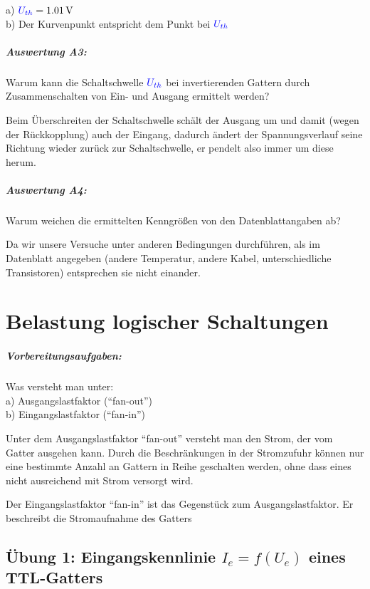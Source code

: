 \documentclass[11pt,a4paper,titlepage]{scrreprt}
\begin{document}
        a) $\textcolor{blue}{U_{th}} = \SI{1,01}{\volt}$\\
        b) Der Kurvenpunkt entspricht dem Punkt bei $\textcolor{blue}{U_{th}}$
    
        \paragraph{Auswertung A3:}\label{sec:auswertung-a3} Warum kann die Schaltschwelle $\textcolor{blue}{U_{th}}$ bei invertierenden Gattern durch Zusammenschalten von Ein- und Ausgang ermittelt werden?

          Beim Überschreiten der Schaltschwelle schält der Ausgang um und damit (wegen der Rückkopplung) auch der Eingang, dadurch ändert der Spannungsverlauf seine Richtung wieder zurück zur Schaltschwelle, er pendelt also immer um diese herum.

        \paragraph{Auswertung A4:} Warum weichen die ermittelten Kenngrößen von den Datenblattangaben ab?

          Da wir unsere Versuche unter anderen Bedingungen durchführen, als im Datenblatt angegeben (andere Temperatur, andere Kabel, unterschiedliche Transistoren) entsprechen sie nicht einander.

    \chapter{Belastung logischer Schaltungen}
      \paragraph{Vorbereitungsaufgaben:} Was versteht man unter:\\
        a) Ausgangslastfaktor ("`fan-out"')\\
        b) Eingangslastfaktor ("`fan-in"')

        Unter dem Ausgangslastfaktor "`fan-out"' versteht man den Strom, der vom Gatter ausgehen kann. Durch die Beschränkungen in der Stromzufuhr können nur eine bestimmte Anzahl an Gattern in Reihe geschalten werden, ohne dass eines nicht ausreichend mit Strom versorgt wird.

        Der Eingangslastfaktor "`fan-in"' ist das Gegenstück zum Ausgangslastfaktor. Er beschreibt die Stromaufnahme des Gatters

    \section{Übung 1: Eingangskennlinie $I_e = f(U_e)$ eines TTL-Gatters}
\end{document}
